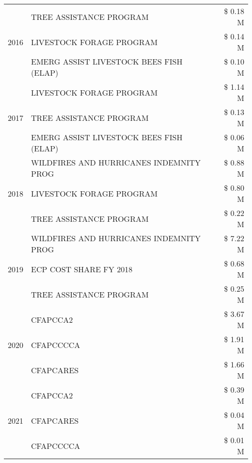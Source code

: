 \begin{tabular}{llr}
\cline{1-3}
\multirow[t]{3}{*}{2016} & TREE ASSISTANCE PROGRAM                       & \$ 0.18 M \\
 & LIVESTOCK FORAGE PROGRAM                      & \$ 0.14 M \\
 & EMERG ASSIST LIVESTOCK BEES FISH (ELAP)       & \$ 0.10 M \\
\cline{1-3}
\multirow[t]{3}{*}{2017} & LIVESTOCK FORAGE PROGRAM & \$ 1.14 M \\
 & TREE ASSISTANCE PROGRAM & \$ 0.13 M \\
 & EMERG ASSIST LIVESTOCK BEES FISH (ELAP) & \$ 0.06 M \\
\cline{1-3}
\multirow[t]{3}{*}{2018} & WILDFIRES AND HURRICANES INDEMNITY PROG & \$ 0.88 M \\
 & LIVESTOCK FORAGE PROGRAM & \$ 0.80 M \\
 & TREE ASSISTANCE PROGRAM & \$ 0.22 M \\
\cline{1-3}
\multirow[t]{3}{*}{2019} & WILDFIRES AND HURRICANES INDEMNITY PROG & \$ 7.22 M \\
 & ECP COST SHARE FY 2018 & \$ 0.68 M \\
 & TREE ASSISTANCE PROGRAM & \$ 0.25 M \\
\cline{1-3}
\multirow[t]{3}{*}{2020} & CFAPCCA2 & \$ 3.67 M \\
 & CFAPCCCCA & \$ 1.91 M \\
 & CFAPCARES & \$ 1.66 M \\
\cline{1-3}
\multirow[t]{3}{*}{2021} & CFAPCCA2 & \$ 0.39 M \\
 & CFAPCARES & \$ 0.04 M \\
 & CFAPCCCCA & \$ 0.01 M \\
\cline{1-3}
\bottomrule
\end{tabular}
